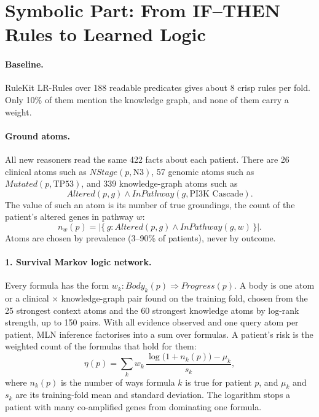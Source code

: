 \documentclass{mnnit}
\begin{document}
\section{Symbolic Part: From IF--THEN Rules to Learned Logic}\label{sec:logic}
\paragraph{Baseline.} RuleKit LR-Rules over 188 readable predicates gives about 8 crisp rules per fold. Only 10\% of
them mention the knowledge graph, and none of them carry a weight.

\paragraph{Ground atoms.} All new reasoners read the same 422 facts about each patient. There are 26 clinical atoms
such as $\mathit{NStage}(p,\mathrm{N3})$, 57 genomic atoms such as $\mathit{Mutated}(p,\mathrm{TP53})$, and 339
knowledge-graph atoms such as
\[
  \mathit{Altered}(p,g) \wedge \mathit{InPathway}(g,\text{PI3K Cascade}).
\]
The value of such an atom is its number of true groundings, the count of the patient's altered genes in pathway $w$:
\begin{equation}
  n_w(p)=\big|\{\,g:\mathit{Altered}(p,g)\wedge\mathit{InPathway}(g,w)\,\}\big|.
\end{equation}
Atoms are chosen by prevalence (3--90\% of patients), never by outcome.

\paragraph{1. Survival Markov logic network.} Every formula has the form
$w_k: \mathit{Body}_k(p) \Rightarrow \mathit{Progress}(p)$. A body is one atom or a clinical $\times$ knowledge-graph
pair found on the training fold, chosen from the 25 strongest context atoms and the 60 strongest knowledge atoms by
log-rank strength, up to 150 pairs. With all evidence observed and one query atom per patient, MLN inference factorises
into a sum over formulas. A patient's risk is the weighted count of the formulas that hold for them:
\begin{equation}
  \eta(p) = \sum_k w_k\, \frac{\log\big(1 + n_k(p)\big)-\mu_k}{s_k},
\end{equation}
where $n_k(p)$ is the number of ways formula $k$ is true for patient $p$, and $\mu_k$ and $s_k$ are its training-fold mean
and standard deviation. The logarithm stops a patient with many co-amplified genes from dominating one formula.
\end{document}

